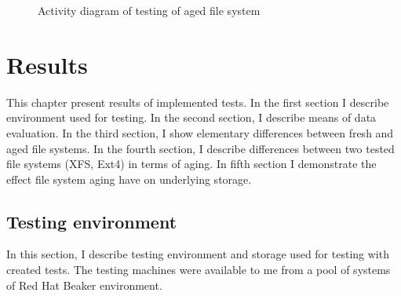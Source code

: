 \documentclass[
  color, %
  table, %
  lof,   %
  lot,   %
]{fithesis3}
\begin{document}
\begin{figure}[ht]
    \centering
    \caption{Activity diagram of testing of aged file system}
    \label{fig:rec_activity}
\end{figure}







\chapter{Results}
\label{results}
This chapter present results of implemented tests. In the first section I describe environment used for testing. In the second section, I describe means of data evaluation. In the third section, I show elementary differences between fresh and aged file systems. In the fourth section, I describe differences between two tested file systems (XFS, Ext4) in terms of aging. In fifth section I demonstrate the effect file system aging have on underlying storage.

\section{Testing environment}
In this section, I describe testing environment and storage used for testing with created tests. The testing machines were available to me from a pool of systems of Red Hat Beaker environment.
\end{document}
